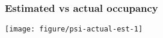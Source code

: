 \documentclass[color=usenames,dvipsnames]{beamer}\usepackage[]{graphicx}\usepackage[]{xcolor}
\newenvironment{knitrout}{}{} %
\begin{document}
\begin{frame}[fragile]
  \frametitle{Estimated vs actual occupancy}
\begin{knitrout}\tiny
{}\color{fgcolor}

{\centering \texttt{[image: figure/psi-actual-est-1]} 

}


\end{knitrout}
\end{frame}













\end{document}
